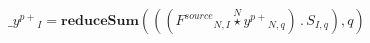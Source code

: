 \documentclass[border=2pt]{standalone}
\begin{document}
${{\_y^{p +}}}{_{I}}=\textbf{reduceSum}\left(\left(\left({{F^{source}}}{_{N, I}} \stackrel{N}{\star} {{y^{p +}}}{_{N, q}}\right) \, . \, {{S}}{_{I, q}}\right),q\right)$
\end{document}
